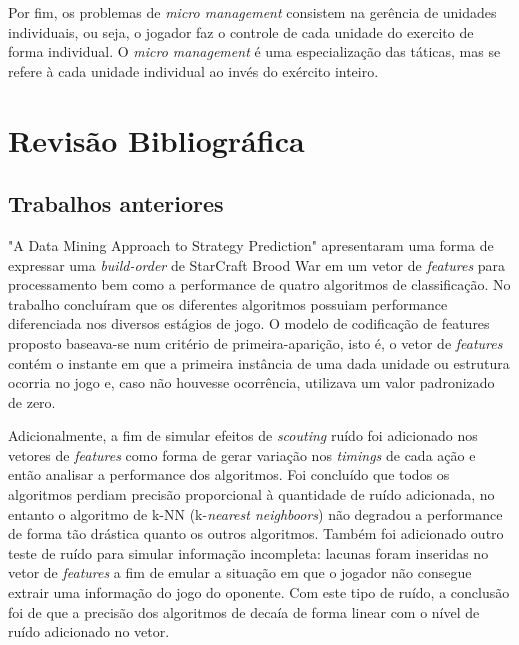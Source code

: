 Por fim, os problemas de \textit{micro management} consistem na gerência de \glspl{unidade} individuais, ou seja, o jogador faz o controle de cada \gls{unidade} do exercito de forma individual. O  \textit{micro management} é uma especialização das táticas, mas se refere à cada \gls{unidade} individual ao invés do exército inteiro.

	\chapter{Revisão Bibliográfica}
		\section{Trabalhos anteriores}
"A Data Mining Approach to Strategy Prediction" \cite{weber2009data} apresentaram uma forma de expressar uma \textit{\gls{build-order}} de StarCraft Brood War em um vetor de \textit{features} para processamento bem como a performance de quatro algoritmos de classificação. No trabalho concluíram que os diferentes algoritmos possuiam performance diferenciada nos diversos estágios de jogo. O modelo de codificação de features proposto baseava-se num critério de primeira-aparição, isto é, o vetor de \textit{features} contém o instante em que a primeira instância de uma dada \gls{unidade} ou \gls{estrutura} ocorria no jogo e, caso não houvesse ocorrência, utilizava um valor padronizado de zero.

Adicionalmente, a fim de simular efeitos de \textit{scouting} ruído foi adicionado nos vetores de \textit{features} como forma de gerar variação nos \textit{timings} de cada ação e então analisar a performance dos algoritmos. Foi concluído que todos os algoritmos perdiam precisão proporcional à quantidade de ruído adicionada, no entanto o algoritmo de k-NN (k-\textit{nearest neighboors}) não degradou a performance de forma tão drástica quanto os outros algoritmos. Também foi adicionado outro teste de ruído para simular informação incompleta: lacunas foram inseridas no vetor de \textit{features} a fim de emular a situação em que o jogador não consegue extrair uma informação do jogo do oponente. Com este tipo de ruído, a conclusão foi de que a precisão dos algoritmos de decaía de forma linear com o nível de ruído adicionado no vetor.

